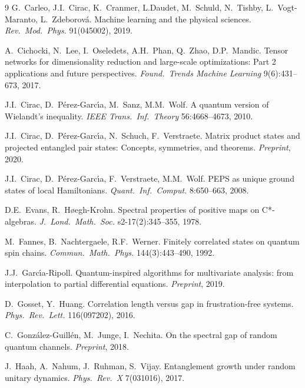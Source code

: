 \documentclass{amsart}
\begin{document}
\begin{thebibliography}{9}
     G.~Carleo, J.I.~Cirac, K.~Cranmer, L.Daudet, M.~Schuld, N.~Tishby, L.~Vogt-Maranto, L.~Zdeborov\'{a}. Machine learning and the physical sciences. \textit{Rev.~Mod.~Phys.} 91(045002), 2019.

     A.~Cichocki, N.~Lee, I.~Oseledets, A.H.~Phan, Q.~Zhao, D.P.~Mandic. Tensor networks for dimensionality reduction and large-scale optimizations: Part 2 applications and future perspectives. \textit{Found.~Trends Machine Learning} 9(6):431--673, 2017.

     J.I.~Cirac, D.~P\'{e}rez-Garc\'{\i}a, M.~Sanz, M.M.~Wolf. A quantum version of Wielandt's inequality. \textit{IEEE Trans.~Inf.~Theory} 56:4668--4673, 2010.

     J.I.~Cirac, D.~P\'{e}rez-Garc\'{\i}a, N.~Schuch, F.~Verstraete. Matrix product states and projected entangled pair states: Concepts, symmetries, and theorems. \textit{Preprint}, 2020.

     J.I.~Cirac, D.~P\'{e}rez-Garc\'{\i}a, F.~Verstraete, M.M.~Wolf. PEPS as unique ground states of local Hamiltonians. \textit{Quant.~Inf.~Comput.} 8:650--663, 2008.

     D.E.~Evans, R.~H\o{}egh-Krohn. Spectral properties of positive maps on C*-algebras. \textit{J.~Lond.~Math.~Soc.} s2-17(2):345--355, 1978.

     M.~Fannes, B.~Nachtergaele, R.F.~Werner. Finitely correlated states on quantum spin chains. \textit{Commun.~Math.~Phys.} 144(3):443--490, 1992.


      J.J.~Garc\'{\i}a-Ripoll. Quantum-inspired algorithms for multivariate analysis: from interpolation to partial differential equations. \textit{Preprint}, 2019.

     D.~Gosset, Y.~Huang. Correlation length versus gap in frustration-free systems. \textit{Phys.~Rev.~Lett.}
    116(097202), 2016.

     C.~Gonz\'{a}lez-Guill\'{e}n, M.~Junge, I.~Nechita. On the spectral gap of random quantum channels. \textit{Preprint}, 2018.

     J.~Haah, A.~Nahum, J.~Ruhman, S.~Vijay. Entanglement growth under random unitary dynamics. \textit{Phys.~Rev.~X} 7(031016), 2017.


\end{thebibliography}
\end{document}
